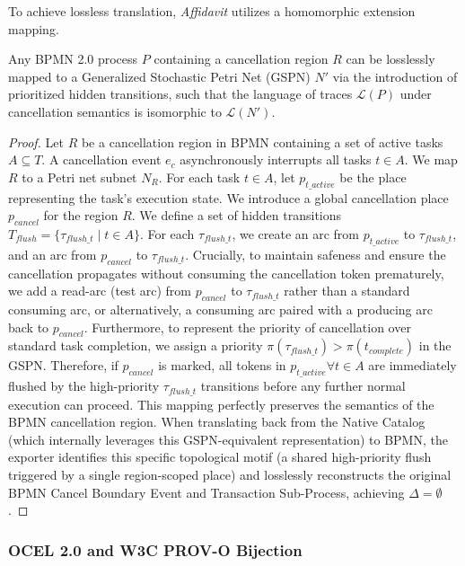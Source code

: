 To achieve lossless translation, \textit{Affidavit} utilizes a homomorphic extension mapping. 

\begin{theorem}
\label{thm:bpmn_cancellation}
Any BPMN 2.0 process $P$ containing a cancellation region $R$ can be losslessly mapped to a Generalized Stochastic Petri Net (GSPN) $N'$ via the introduction of prioritized hidden transitions, such that the language of traces $\mathcal{L}(P)$ under cancellation semantics is isomorphic to $\mathcal{L}(N')$.
\end{theorem}

\begin{proof}
Let $R$ be a cancellation region in BPMN containing a set of active tasks $A \subseteq T$. A cancellation event $e_c$ asynchronously interrupts all tasks $t \in A$.
We map $R$ to a Petri net subnet $N_R$. For each task $t \in A$, let $p_{t\_active}$ be the place representing the task's execution state. We introduce a global cancellation place $p_{cancel}$ for the region $R$. 
We define a set of hidden transitions $T_{flush} = \{ \tau_{flush\_t} \mid t \in A \}$. For each $\tau_{flush\_t}$, we create an arc from $p_{t\_active}$ to $\tau_{flush\_t}$, and an arc from $p_{cancel}$ to $\tau_{flush\_t}$. Crucially, to maintain safeness and ensure the cancellation propagates without consuming the cancellation token prematurely, we add a read-arc (test arc) from $p_{cancel}$ to $\tau_{flush\_t}$ rather than a standard consuming arc, or alternatively, a consuming arc paired with a producing arc back to $p_{cancel}$.
Furthermore, to represent the priority of cancellation over standard task completion, we assign a priority $\pi(\tau_{flush\_t}) > \pi(t_{complete})$ in the GSPN.
Therefore, if $p_{cancel}$ is marked, all tokens in $p_{t\_active} \forall t \in A$ are immediately flushed by the high-priority $\tau_{flush\_t}$ transitions before any further normal execution can proceed.
This mapping perfectly preserves the semantics of the BPMN cancellation region. When translating back from the Native Catalog (which internally leverages this GSPN-equivalent representation) to BPMN, the exporter identifies this specific topological motif (a shared high-priority flush triggered by a single region-scoped place) and losslessly reconstructs the original BPMN Cancel Boundary Event and Transaction Sub-Process, achieving $\Delta = \emptyset$.
\end{proof}

\subsubsection{OCEL 2.0 and W3C PROV-O Bijection}

